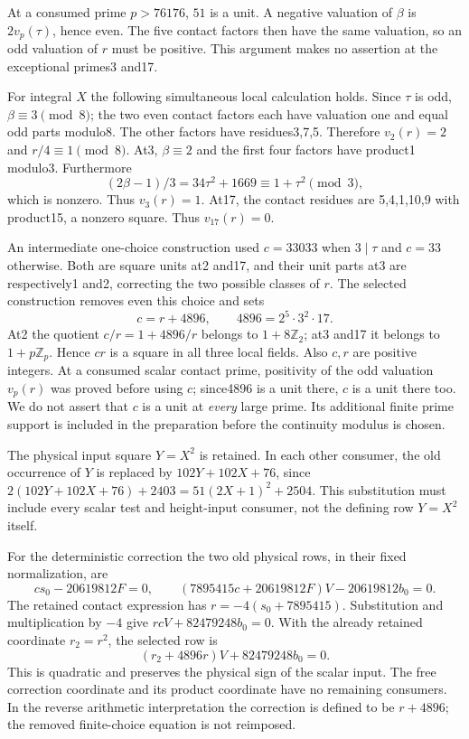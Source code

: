 At a consumed prime $p>76176$, $51$ is a unit. A negative valuation
of $\beta$ is $2v_p(\tau)$, hence even. The five contact factors then
have the same valuation, so an odd valuation of $r$ must be positive.
This argument makes no assertion at the exceptional primes3 and17.

For integral $X$ the following simultaneous local calculation holds.
Since $\tau$ is odd, $\beta\equiv3\pmod8$; the two even contact
factors each have valuation one and equal odd parts modulo8. The
other factors have residues3,7,5. Therefore $v_2(r)=2$ and
$r/4\equiv1\pmod8$. At3, $\beta\equiv2$ and the first four factors
have product1 modulo3. Furthermore
\[
 (2\beta-1)/3=34\tau^2+1669\equiv1+\tau^2\pmod3,
\]
which is nonzero. Thus $v_3(r)=1$. At17, the contact residues are
5,4,1,10,9 with product15, a nonzero square. Thus $v_{17}(r)=0$.

An intermediate one-choice construction used $c=33033$ when
$3\mid\tau$ and $c=33$ otherwise. Both are square units at2 and17,
and their unit parts at3 are respectively1 and2, correcting the two
possible classes of $r$. The selected construction removes even
this choice and sets
\[
                 c=r+4896,\qquad4896=2^5\cdot3^2\cdot17.
\]
At2 the quotient $c/r=1+4896/r$ belongs to $1+8\mathbb Z_2$;
at3 and17 it belongs to $1+p\mathbb Z_p$. Hence $cr$ is a square
in all three local fields. Also $c,r$ are positive integers.
At a consumed scalar contact prime, positivity of the odd valuation
$v_p(r)$ was proved before using $c$; since4896 is a unit there,
$c$ is a unit there too. We do not assert that $c$ is a unit at
\emph{every} large prime. Its additional finite prime support is
included in the preparation before the continuity modulus is chosen.

The physical input square $Y=X^2$ is retained. In each other consumer,
the old occurrence of $Y$ is replaced by $102Y+102X+76$, since
$2(102Y+102X+76)+2403=51(2X+1)^2+2504$. This substitution must
include every scalar test and height-input consumer, not the defining
row $Y=X^2$ itself.

For the deterministic correction the two old physical rows, in their
fixed normalization, are
\[
 cs_0-20619812F=0,\qquad
 (7895415c+20619812F)V-20619812b_0=0.
\]
The retained contact expression has $r=-4(s_0+7895415)$.
Substitution and multiplication by $-4$ give
$rcV+82479248b_0=0$. With the already retained coordinate $r_2=r^2$,
the selected row is
\[
                    (r_2+4896r)V+82479248b_0=0.
\]
This is quadratic and preserves the physical sign of the scalar input.
The free correction coordinate and its product coordinate have no
remaining consumers. In the reverse arithmetic interpretation the
correction is defined to be $r+4896$; the removed finite-choice equation
is not reimposed.

